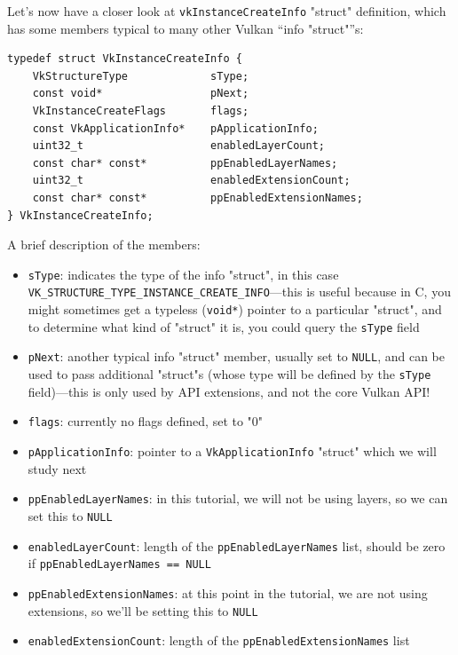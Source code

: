 \documentclass[12pt,letterpaper]{article}
\newcommand{\inquotes}[1]{``#1''}	%
\newcommand{\cil}[1]{\texttt{#1}}
\begin{document}
	Let's now have a closer look at \cil{vkInstanceCreateInfo} "struct" definition, which has some members typical to many other Vulkan \inquotes{info "struct"}s:
		\begin{verbatim}
typedef struct VkInstanceCreateInfo {
	VkStructureType             sType;
	const void*                 pNext;
	VkInstanceCreateFlags       flags;
	const VkApplicationInfo*    pApplicationInfo;
	uint32_t                    enabledLayerCount;
	const char* const*          ppEnabledLayerNames;
	uint32_t                    enabledExtensionCount;
	const char* const*          ppEnabledExtensionNames;
} VkInstanceCreateInfo;
		\end{verbatim}
	A brief description of the members:
		\begin{itemize}
			\item \cil{sType}: indicates the type of the info "struct", in this case \cil{VK_STRUCTURE_TYPE_INSTANCE_CREATE_INFO}---this is useful because in C, you might sometimes get a typeless (\cil{void*}) pointer to a particular "struct", and to determine what kind of "struct" it is, you could query the \cil{sType} field
			
			\item \cil{pNext}: another typical info "struct" member, usually set to \cil{NULL}, and can be used to pass additional "struct"s (whose type will be defined by the \cil{sType} field)---this is only used by API extensions, and not the core Vulkan API!
			
			\item \cil{flags}: currently no flags defined, set to "0"
			
			\item \cil{pApplicationInfo}: pointer to a \cil{VkApplicationInfo} "struct" which we will study next
			
			\item \cil{ppEnabledLayerNames}: in this tutorial, we will not be using layers, so we can set this to \cil{NULL}
			
			\item \cil{enabledLayerCount}: length of the \cil{ppEnabledLayerNames} list, should be zero if \cil{ppEnabledLayerNames == NULL}
			
			\item \cil{ppEnabledExtensionNames}: at this point in the tutorial, we are not using extensions, so we'll be setting this to \cil{NULL}
			
			\item \cil{enabledExtensionCount}: length of the \cil{ppEnabledExtensionNames} list
		\end{itemize}
\end{document}
